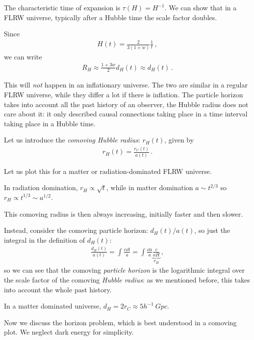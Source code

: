 \documentclass[main.tex]{subfiles}
\begin{document}
The characteristic time of expansion is \(\tau (H ) =H^{-1}\). 
We can show that in a FLRW universe, typically after a Hubble time the scale factor doubles. 

Since 
%
\begin{align}
H(t) = \frac{2}{3 (1+w)} \frac{1}{t} 
\,,
\end{align}
%
we can write
%
\begin{align}
R_H \approx \frac{1 + 3w}{2} d_H (t) \approx d_H (t)
\,.
\end{align}


This will \emph{not} happen in an inflationary universe.
The two are similar in a regular FLRW universe, while they differ a lot if there is inflation. 
The particle horizon takes into account all the past history of an observer, the Hubble radius does not care about it: it only described causal connections taking place in a time interval taking place in a Hubble time. 

Let us introduce the \emph{comoving Hubble radius}: \(r_H (t)\), given by 
%
\begin{align}
r_H (t) = \frac{r_C (t)}{a(t)}
\,.
\end{align}

Let us plot this for a matter or radiation-dominated FLRW universe.

In radiation domination, \(r_H \propto \sqrt{t}\), while in matter domination \(a \sim t^{2/3}\) so \(r_H \propto t^{1/3} \sim a^{1/2}\). 

This comoving radius is then always increasing, initially faster and then slower. 

Instead, consider the comoving particle horizon: \(d_H (t) / a(t)\), so just the integral in the definition of \(d_H(t)\): 
%
\begin{align}
\frac{d_H (t)}{a(t)} = \int \frac{c \dd{t}}{a} = \int \frac{ \dd{a}}{a} \underbrace{\frac{c}{a H}}_{r_H}
\,,
\end{align}
%
so we can see that the comoving \emph{particle horizon} is the logarithmic integral over the scale factor of the comoving \emph{Hubble radius}: as we mentioned before, this takes into account the whole past history. 

In a matter dominated universe, \(d_H = 2 r_C \approx 5 h^{-1} \SI{}{Gpc}\).

Now we discuss the horizon problem, which is best understood in a comoving plot. We neglect dark energy for simplicity.
\end{document}
